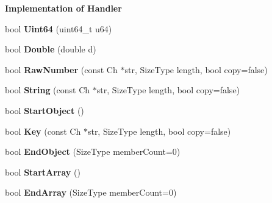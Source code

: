\begin{Indent}{\bf Implementation of Handler}
\begin{DoxyCompactItemize}
\item 
bool {\bfseries Uint64} (uint64\+\_\+t u64)\hypertarget{class_pretty_writer_aba75ac1f13c2629b2a55ffbf3d8a116c}{}\label{class_pretty_writer_aba75ac1f13c2629b2a55ffbf3d8a116c}

\item 
bool {\bfseries Double} (double d)\hypertarget{class_pretty_writer_ad9d592e86b985da666665926e87db415}{}\label{class_pretty_writer_ad9d592e86b985da666665926e87db415}

\item 
bool {\bfseries Raw\+Number} (const Ch $\ast$str, Size\+Type length, bool copy=false)\hypertarget{class_pretty_writer_a3941bc21d6a261ca8a86eff330db30ef}{}\label{class_pretty_writer_a3941bc21d6a261ca8a86eff330db30ef}

\item 
bool {\bfseries String} (const Ch $\ast$str, Size\+Type length, bool copy=false)\hypertarget{class_pretty_writer_ae544ccfe35dd7e80ed694873062409f6}{}\label{class_pretty_writer_ae544ccfe35dd7e80ed694873062409f6}

\item 
bool {\bfseries Start\+Object} ()\hypertarget{class_pretty_writer_a27bdda225dc152b8974e44c1df7525b7}{}\label{class_pretty_writer_a27bdda225dc152b8974e44c1df7525b7}

\item 
bool {\bfseries Key} (const Ch $\ast$str, Size\+Type length, bool copy=false)\hypertarget{class_pretty_writer_a20ecbe1d31a871e4da4a3899b40ad3cd}{}\label{class_pretty_writer_a20ecbe1d31a871e4da4a3899b40ad3cd}

\item 
bool {\bfseries End\+Object} (Size\+Type member\+Count=0)\hypertarget{class_pretty_writer_a6bfdfa4193193ef763cce5c592c4d20c}{}\label{class_pretty_writer_a6bfdfa4193193ef763cce5c592c4d20c}

\item 
bool {\bfseries Start\+Array} ()\hypertarget{class_pretty_writer_aec7fdf4798a3af5e31c147633f4798ed}{}\label{class_pretty_writer_aec7fdf4798a3af5e31c147633f4798ed}

\item 
bool {\bfseries End\+Array} (Size\+Type member\+Count=0)\hypertarget{class_pretty_writer_a1e9d97fc950d349f55abd864c787ff37}{}\label{class_pretty_writer_a1e9d97fc950d349f55abd864c787ff37}

\end{DoxyCompactItemize}
\end{Indent}
